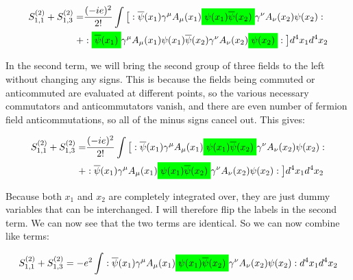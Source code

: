 \documentclass[a4]{article}
\newcommand{\highlight}[2][yellow]{\mathchoice
  {\colorbox{#1}{$\displaystyle#2$}}
  {\colorbox{#1}{$\textstyle#2$}}
  {\colorbox{#1}{$\scriptstyle#2$}}
  {\colorbox{#1}{$\scriptscriptstyle#2$}}}
\begin{document}
        \begin{equation}
            \begin{aligned}
            S^{(2)}_{1,1} + S^{(2)}_{1,3} = & \frac{(-ie)^2}{2!} \int \big[ :\overline{\psi} (x_1) \gamma^{\mu} A_{\mu} (x_1) \highlight[green]{\psi (x_1) \overline{\psi} (x_2)} \gamma^{\nu} A_{\nu} (x_2) \psi (x_2): \\
            + & :\highlight[green]{\overline{\psi} (x_1)} \gamma^{\mu} A_{\mu} (x_1) \psi (x_1) \overline{\psi} (x_2) \gamma^{\nu} A_{\nu} (x_2) \highlight[green]{\psi (x_2)}: \big] d^{4} x_{1} d^{4} x_{2}
            \end{aligned}
        \end{equation}
        
        In the second term, we will bring the second group of three fields to the left without changing any signs. This is because the fields being commuted or anticommuted are evaluated at different points, so the various necessary commutators
        and anticommutators vanish, and there are even number of fermion field anticommutations, so all of the minus signs cancel out. This gives:

        \begin{equation}
            \begin{aligned}
            S^{(2)}_{1,1} + S^{(2)}_{1,3} = & \frac{(-ie)^2}{2!} \int \big[ :\overline{\psi} (x_1) \gamma^{\mu} A_{\mu} (x_1) \highlight[green]{\psi (x_1) \overline{\psi} (x_2)} \gamma^{\nu} A_{\nu} (x_2) \psi (x_2): \\
            + & :\overline{\psi} (x_1) \gamma^{\mu} A_{\mu} (x_1) \highlight[green]{\psi (x_1) \overline{\psi} (x_2)} \gamma^{\nu} A_{\nu} (x_2) \psi (x_2): \big] d^{4} x_{1} d^{4} x_{2}
            \end{aligned}
        \end{equation}

        Because both $x_{1}$ and $x_{2}$ are completely integrated over, they are just dummy variables that can be interchanged. I will therefore flip the labels in the second term. 
        We can now see that the two terms are identical. So we can now combine like terms:

        \begin{equation}
            S^{(2)}_{1,1} + S^{(2)}_{1,3} = - e^{2} \int :\overline{\psi} (x_1) \gamma^{\mu} A_{\mu} (x_1) \highlight[green]{\psi (x_1) \overline{\psi} (x_2)} \gamma^{\nu} A_{\nu} (x_2) \psi (x_2): d^{4} x_{1} d^{4} x_{2}
        \end{equation}
\end{document}
